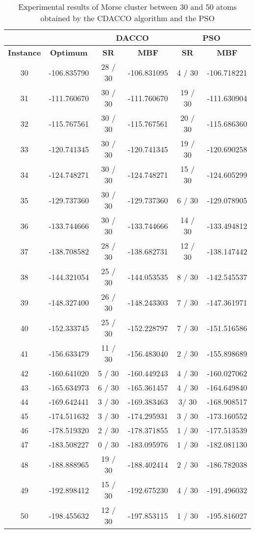 	\begin{table}[!htdp]
			\begin{center}
				\begin{tabular}{| c | c | c | c | c | c |}
					\hline
					\multicolumn{2}{|c|}{} & \multicolumn{2}{c|}{\textbf{DACCO}} & \multicolumn{2}{c|}{\textbf{PSO}}\\ \hline
					\textbf{Instance} & \textbf{Optimum} & \textbf{SR} & \textbf{MBF} & \textbf{SR} & \textbf{MBF} \\ \hline
					30 & -106.835790 & 28 / 30 & -106.831095 & 4 / 30 & -106.718221 \\ \hline
					31 & -111.760670 & 30 / 30 & -111.760670 & 19 / 30 & -111.630904 \\ \hline
					32 & -115.767561 & 30 / 30 & -115.767561 & 20 / 30 & -115.686360 \\ \hline
					33 & -120.741345 & 30 / 30 & -120.741345 & 19 / 30 & -120.690258 \\ \hline
					34 & -124.748271 & 30 / 30 & -124.748271 & 15 / 30 & -124.605299 \\ \hline
					35 & -129.737360 & 30 / 30 & -129.737360 & 6 / 30 & -129.078905 \\ \hline
					36 & -133.744666 & 30 / 30 & -133.744666 & 14 / 30 & -133.494812 \\ \hline
					37 & -138.708582 & 28 / 30 & -138.682731 & 12 / 30 & -138.147442 \\ \hline
					38 & -144.321054 & 25 / 30 & -144.053535 & 8 / 30 & -142.545537 \\ \hline
					39 & -148.327400 & 26 / 30 & -148.243303 & 7 / 30 & -147.361971 \\ \hline
					40 & -152.333745 & 25 / 30 & -152.228797 & 7 / 30 & -151.516586 \\ \hline
					41 & -156.633479 & 11 / 30 & -156.483040 & 2 / 30 & -155.898689 \\ \hline
					42 & -160.641020 & 5 / 30 & -160.449243 & 4 / 30 & -160.027062 \\ \hline
					43 & -165.634973 & 6 / 30 & -165.361457 & 4 / 30 & -164.649840 \\ \hline
					44 & -169.642441 & 3 / 30 & -169.383463 & 3/ 30 & -168.908517 \\ \hline
					45 & -174.511632 & 3 / 30 & -174.295931 & 3 / 30 & -173.160552 \\ \hline
					46 & -178.519320 & 2 / 30 & -178.371855 & 1 / 30 & -177.513539 \\ \hline
					47 & -183.508227 & 0 / 30 & -183.095976 & 1 / 30 & -182.081130 \\ \hline
					48 & -188.888965 & 19 / 30 & -188.402414 & 2 / 30 & -186.782038 \\ \hline
					49 & -192.898412 & 15 / 30 & -192.675230 & 4 / 30 & -191.496032 \\ \hline
					50 & -198.455632 & 12 / 30 & -197.853115 & 1 / 30 & -195.816027 \\ \hline
				\end{tabular}
			\end{center}
			\caption{Experimental results of Morse cluster between 30 and 50 atoms obtained by the CDACCO algorithm and the PSO}
			\label{tab:dacco_vs_pso}
		\end{table}
		
